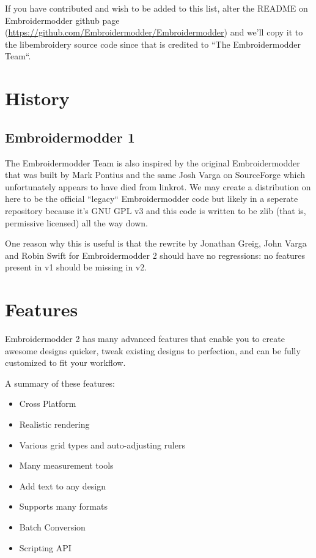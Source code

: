 \documentclass[11pt]{report}
\begin{document}
If you have contributed and wish to be added to this list, alter the  README on Embroidermodder
github page (\url{https://github.com/Embroidermodder/Embroidermodder}) and we'll copy it to the
libembroidery source code since that is credited to ``The Embroidermodder Team``.

\section{History}

\subsection{Embroidermodder 1}

The Embroidermodder Team is also inspired by the original Embroidermodder that
was built by Mark Pontius and the same Josh Varga on SourceForge which
unfortunately appears to have died from linkrot. We may create a distribution
on here to be the official ``legacy`` Embroidermodder code but likely in a
seperate repository because it's GNU GPL v3 and this code is written to be
zlib (that is, permissive licensed) all the way down.

One reason why this is useful is that the rewrite by Jonathan Greig, John Varga
and Robin Swift for Embroidermodder 2 should have no regressions: no features
present in v1 should be missing in v2.

\section{Features}

Embroidermodder 2 has many advanced features that enable you to create awesome designs quicker, tweak existing designs to perfection, and can be fully customized to fit your workflow.

A summary of these features:

\begin{itemize}
\item Cross Platform
\item Realistic rendering
\item Various grid types and auto-adjusting rulers
\item Many measurement tools
\item Add text to any design
\item Supports many formats
\item Batch Conversion
\item Scripting API
\end{itemize}
\end{document}
